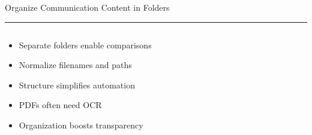 \documentclass[aspectratio=169]{beamer}
\newcommand{\TitleFont}{\rmfamily}
\begin{document}
\begin{frame}[t]{}
  \vspace*{0.5cm}
  {\TitleFont\fontsize{18}{22}\selectfont\color{LUBronze}Organize Communication Content in Folders\par}
  \vspace{0.3em}
  {\color{LUBronze}\rule{\linewidth}{0.8pt}}\par
  \vspace{0.2cm}
  \begin{columns}[t]
    \begin{column}[t]{0.45\textwidth}
      \vspace*{0pt}
      \begin{itemize}\setlength\itemsep{0.65em}
        \item Separate folders enable comparisons
        \item Normalize filenames and paths
        \item Structure simplifies automation
        \item PDFs often need OCR
        \item Organization boosts transparency
      \end{itemize}
    \end{column}
  \end{columns}
\end{frame}
\end{document}
